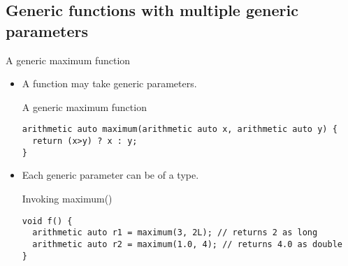 \subsection{Generic functions with multiple generic parameters}

\begin{frame}[t,fragile]{A generic maximum function}
\begin{itemize}
  \item A function may take  generic parameters.

\begin{block}{A generic maximum function}
\begin{lstlisting}
arithmetic auto maximum(arithmetic auto x, arithmetic auto y) {
  return (x>y) ? x : y;
}
\end{lstlisting}
\end{block}

  \item Each generic parameter can be of a  type.

\begin{block}{Invoking maximum()}
\begin{lstlisting}
void f() {
  arithmetic auto r1 = maximum(3, 2L); // returns 2 as long
  arithmetic auto r2 = maximum(1.0, 4); // returns 4.0 as double
}
\end{lstlisting}
\end{block}

\end{itemize}
\end{frame}


